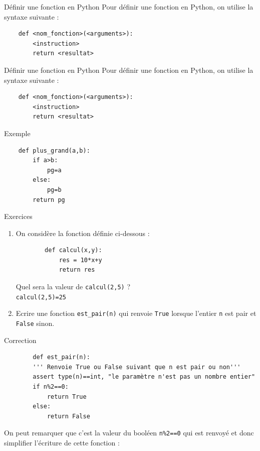 \documentclass[10pt]{beamer}
\begin{document}
\begin{frame}[fragile]
	\mframe{\Python}
	\begin{alertblock}{Définir une fonction en Python}
		Pour définir une fonction en Python, on utilise la syntaxe suivante :
		\begin{lstlisting}
	def <nom_fonction>(<arguments>):
		<instruction>
		return <resultat>
	\end{lstlisting}
	\end{alertblock}
\end{frame}


\begin{frame}[fragile]
	\mframe{\Python}
	\begin{alertblock}{Définir une fonction en Python}
		Pour définir une fonction en Python, on utilise la syntaxe suivante :
		\begin{lstlisting}
	def <nom_fonction>(<arguments>):
		<instruction>
		return <resultat>
	\end{lstlisting}
	\end{alertblock}
	\begin{exampleblock}{Exemple}
		\begin{lstlisting}
	def plus_grand(a,b):
		if a>b:
			pg=a
		else:
			pg=b
		return pg
	\end{lstlisting}
	\end{exampleblock}
\end{frame}

\begin{frame}[fragile]
	\mframe{\Python}
	\begin{exampleblock}{Exercices}
		\begin{enumerate}
			\item On considère la fonction définie ci-dessous :
			      \begin{lstlisting}
		def calcul(x,y):
			res = 10*x+y
			return res
				\end{lstlisting}
			      Quel sera la valeur de {\tt calcul(2,5)} ? \\
				  \onslide<2->\textcolor{OliveGreen}{\tt calcul(2,5)=25}
			\item Ecrire une fonction {\tt est\_pair(n)} qui renvoie {\tt True} lorsque l'entier {\tt n} est pair et {\tt False} sinon.
		\end{enumerate}
	\end{exampleblock}
\end{frame}

\begin{frame}[fragile]
	\mframe{\Python}
	\begin{exampleblock}{Correction}
			      \begin{lstlisting}
		def est_pair(n):
		''' Renvoie True ou False suivant que n est pair ou non'''
		assert type(n)==int, "le paramètre n'est pas un nombre entier"
		if n%2==0:
			return True
		else:
			return False
				\end{lstlisting}
	On peut remarquer que c'est la valeur du booléen {\tt n\%2==0} qui est renvoyé et donc simplifier l'écriture de cette fonction :
	\end{exampleblock}
\end{frame}
\end{document}

